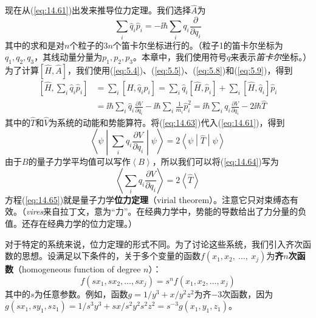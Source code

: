     现在从(\ref{eq:14.61})出发来推导位力定理。我们选择$\hat{A}$为
    \begin{equation}
        \sum_i \hat{q}_i \hat{p}_i = -\ii \hbar \sum_i q_i \frac{\partial}{\partial q_i}
        \label{eq:14.62}
    \end{equation}
    其中的求和是对$n$个粒子的$3n$个笛卡尔坐标进行的。（粒子1的笛卡尔坐标为$q_1, q_2, q_3$，其线动量分量为$p_1, p_2, p_3$。本章中，我们使用符号$q$来表示\textit{笛卡尔}坐标。）为了计算$\left[\hat{H}, \hat{A}\right]$，我们使用(\ref{eq:5.4})、(\ref{eq:5.5})、(\ref{eq:5.8})和(\ref{eq:5.9})，得到
    \begin{align}
        \left[\hat{H}, \sum_i \hat{q}_i \hat{p}_i\right] &= \sum_i \left[\hat{H}, \hat{q}_i \hat{p}_i\right] = \sum_i \hat{q}_i \left[\hat{H}, \hat{p}_i\right] + \sum_i \left[\hat{H}, \hat{q}_i\right] \hat{p}_i \nonumber \\
        &= \ii \hbar \sum_i \hat{q}_i \frac{\partial V}{\partial q_i} - \ii \hbar \sum_i \frac{1}{m_i} \hat{p}_i^2 = \ii \hbar \sum_i q_i \frac{\partial V}{\partial q_i} - 2 \ii \hbar \hat{T}
        \label{eq:14.63}
    \end{align}
    其中的$\hat{T}$和$\hat{V}$为系统的动能和势能算符。将(\ref{eq:14.63})代入(\ref{eq:14.61})，得到
    \begin{equation}
        \left\langle \psi \middle| \sum_i q_i \frac{\partial V}{\partial q_i} \middle| \psi \right\rangle = 2 \left\langle \psi \middle| \hat{T} \middle| \psi \right\rangle
        \label{eq:14.64}
    \end{equation}
    由于$B$的量子力学平均值可以写作$\left\langle B \right\rangle$，所以我们可以将(\ref{eq:14.64})写为
    \begin{equation}
        \left\langle \sum_i q_i \frac{\partial V}{\partial q_i} \right\rangle = 2 \left\langle \hat{T} \right\rangle
        \label{eq:14.65}
    \end{equation}
    方程(\ref{eq:14.65})就是量子力学\textbf{位力定理}（virial theorem）。注意它只对束缚态有效。（\textit{vires}来自拉丁文，意为“力”。在经典力学中，势能的导数给出了力分量的负值。还存在经典力学的位力定理。）

    对于特定的系统来说，位力定理的形式不同。为了讨论这些系统，我们引入齐次函数的思想。设满足以下条件的，关于多个变量的函数$f\left(x_1, x_2, \:\ldots,\: x_j\right)$为\textbf{齐$n$次函数}（homogeneous function of degree $n$）：
    \begin{equation}
        \boxed{
            f\left(sx_1, sx_2, \ldots, sx_j\right) = s^n f\left(x_1, x_2, \ldots, x_j\right)
        }
        \label{eq:14.66}
    \end{equation}
    其中的$s$为任意参数。例如，函数$g = 1/y^3 + x/y^2z^2$为齐$-3$次函数，因为$g\left(sx_1, sy_1, sz_1\right) = 1/s^3y^3 + sx/s^2y^2s^2z^2 = s^{-3} g\left(x_1, y_1, z_1\right)$。

